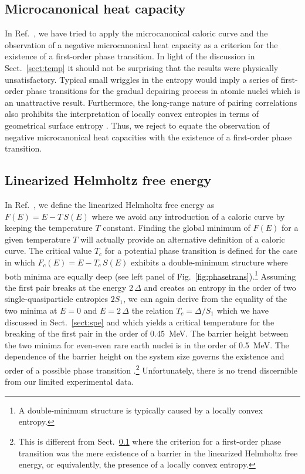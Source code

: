 \documentclass[sort&compress,final,numberedheadings]{aipproc}
\begin{document}
\subsection{Microcanonical heat capacity}
\label{sect:miccv}

In Ref.\ \cite{MG01}, we have tried to apply the microcanonical caloric curve 
and the observation of a negative microcanonical heat capacity as a criterion  
for the existence of a first-order phase transition. In light of the discussion
in Sect.\ \ref{sect:temp} it should not be surprising that the results were 
physically unsatisfactory. Typical small wriggles in the entropy would imply a 
series of first-order phase transitions for the gradual depairing process in 
atomic nuclei which is an unattractive result. Furthermore, the long-range 
nature of pairing correlations also prohibits the interpretation of locally 
convex entropies in terms of geometrical surface entropy \cite{Gr97}. Thus, we 
reject to equate the observation of negative microcanonical heat capacities 
with the existence of a first-order phase transition.

\subsection{Linearized Helmholtz free energy}
\label{sect:fc}

In Ref.\ \cite{GC03}, we define the linearized Helmholtz free energy as 
$F(E)=E-T\,S(E)$ where we avoid any introduction of a caloric curve by keeping 
the temperature $T$ constant. Finding the global minimum of $F(E)$ for a given 
temperature $T$ will actually provide an alternative definition of a caloric 
curve. The critical value $T_c$ for a potential phase transition is defined for
the case in which $F_c(E)=E-T_c\,S(E)$ exhibits a double-minimum structure 
where both minima are equally deep (see left panel of Fig.\ 
\ref{fig:phasetrans}).\footnote{A double-minimum structure is typically caused 
by a locally convex entropy.} Assuming the first pair breaks at the energy 
$2\,\Delta$ and creates an entropy in the order of two single-quasiparticle 
entropies $2S_1$, we can again derive from the equality of the two minima at 
$E=0$ and $E=2\,\Delta$ the relation $T_c=\Delta/S_1$ which we have discussed 
in Sect.\ \ref{sect:spe} and which yields a critical temperature for the 
breaking of the first pair in the order of 0.45~MeV\@. The barrier height 
between the two minima for even-even rare earth nuclei is in the order of 
0.5~MeV\@. The dependence of the barrier height on the system size governs the 
existence and order of a possible phase transition 
\cite{LK90+LK91}.\footnote{This is different from Sect.\ 
\protect\ref{sect:miccv} where the criterion for a first-order phase transition
was the mere existence of a barrier in the linearized Helmholtz free energy, or
equivalently, the presence of a locally convex entropy.} Unfortunately, there 
is no trend discernible from our limited experimental data. 
\end{document}
